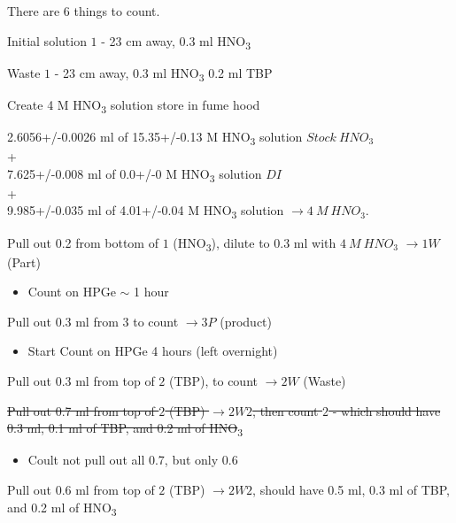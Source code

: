 \documentclass[idxtotoc,hyperref,openany,oneside]{labbook} %
\newcommand{\cmark}{\ding{51}}%
\newcommand{\done}{\rlap{$\square$}{\raisebox{2pt}{\large\hspace{1pt}\cmark}}%
  \hspace{-2.5pt}}
\newcommand{\tsbs}{\textsubscript}
\begin{document}


There are 6 things to count.
\begin{todolist}
\item[\done]{Initial solution $\boxed{1}$ - 23 cm away, 0.3 ml HNO\tsbs{3}}
\item[\done]{Waste $\boxed{1}$ - 23 cm away, 0.3 ml HNO\tsbs{3} 0.2 ml TBP}
\item[\done]{Create 4 M HNO\tsbs{3} solution store in fume hood}
\end{todolist}
\begin{center}
2.6056+/-0.0026 ml of 15.35+/-0.13 M HNO\tsbs{3} solution $\boxed{Stock\ HNO_3}$\\
+\\
7.625+/-0.008 ml of 0.0+/-0 M HNO\tsbs{3} solution $\boxed{DI}$\\
+\\
9.985+/-0.035 ml of 4.01+/-0.04 M HNO\tsbs{3} solution $\boxed{\rightarrow 4\ M\ HNO_3}$.
\end{center}
\begin{todolist}
\item[\done]{Pull out 0.2 from bottom of $\boxed{1}$ (HNO\tsbs{3}),
  dilute to 0.3 ml with $\boxed{4\ M\ HNO_3}$ $\boxed{\rightarrow 1W}$ (Part)}
  \begin{itemize}
  \item{Count on HPGe $\sim$ 1 hour}
  \end{itemize}
\item[\done]{Pull out 0.3 ml from $\boxed{3}$ to count
  $\boxed{\rightarrow 3P}$ (product)}
  \begin{itemize}
  \item{Start Count on HPGe 4 hours (left overnight)}
  \end{itemize}
\item[\done]{Pull out 0.3 ml from top of $\boxed{2}$ (TBP), to count
       $\boxed{\rightarrow 2W}$ (Waste)}
\item{\st{Pull out 0.7 ml from top of $\boxed{2}$ (TBP)
  $\boxed{\rightarrow 2W2}$, then count $\boxed{2}$ - which should
    have 0.3 ml, 0.1 ml of TBP, and 0.2 ml of HNO}\tsbs{3}}
  \begin{itemize}
  \item{Coult not pull out all 0.7, but only 0.6}
  \end{itemize}
\item[\done]{Pull out 0.6 ml from top of $\boxed{2}$ (TBP)
  $\boxed{\rightarrow 2W2}$, should have 0.5 ml, 0.3 ml of TBP,
  and 0.2 ml of HNO\tsbs{3}}
\end{todolist}
\end{document}
